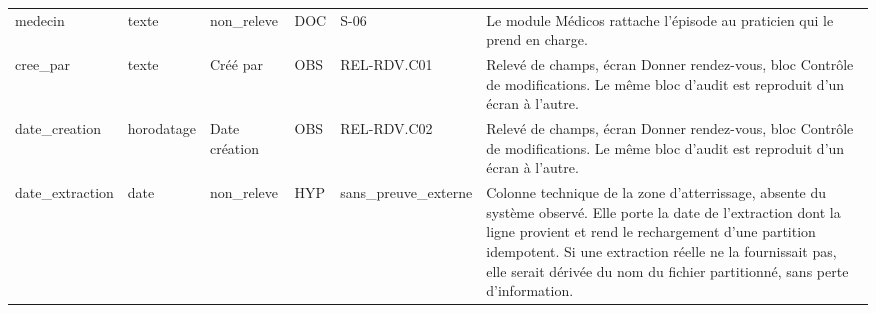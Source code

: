 \begin{longtable}{p{2.5cm}p{1.8cm}p{2.8cm}p{1.3cm}p{2.2cm}p{5cm}}
medecin & texte & non\_releve & DOC & S-06 & Le module Médicos rattache l'épisode au praticien qui le prend en charge. \\
cree\_par & texte & Créé par & OBS & REL-RDV.C01 & Relevé de champs, écran Donner rendez-vous, bloc Contrôle de modifications. Le même bloc d'audit est reproduit d'un écran à l'autre. \\
date\_creation & horodatage & Date création & OBS & REL-RDV.C02 & Relevé de champs, écran Donner rendez-vous, bloc Contrôle de modifications. Le même bloc d'audit est reproduit d'un écran à l'autre. \\
date\_extraction & date & non\_releve & HYP & sans\_preuve\_externe & Colonne technique de la zone d'atterrissage, absente du système observé. Elle porte la date de l'extraction dont la ligne provient et rend le rechargement d'une partition idempotent. Si une extraction réelle ne la fournissait pas, elle serait dérivée du nom du fichier partitionné, sans perte d'information. \\
\hline
\end{longtable}

